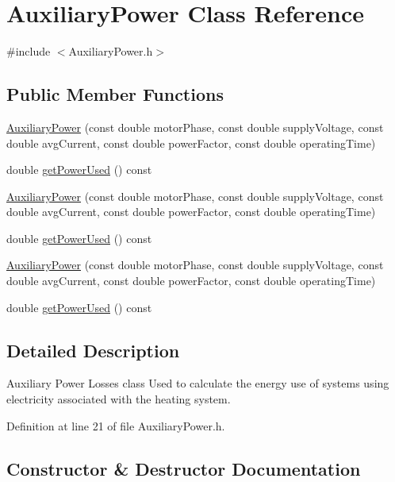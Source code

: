 \hypertarget{class_auxiliary_power}{}\section{Auxiliary\+Power Class Reference}
\label{class_auxiliary_power}


{\ttfamily \#include $<$Auxiliary\+Power.\+h$>$}

\subsection*{Public Member Functions}
\begin{DoxyCompactItemize}
\item 
\hyperlink{class_auxiliary_power_aef0d5c2c60a2481b16cc201ba2e69fe7}{Auxiliary\+Power} (const double motor\+Phase, const double supply\+Voltage, const double avg\+Current, const double power\+Factor, const double operating\+Time)
\item 
double \hyperlink{class_auxiliary_power_a824ece4e6bb789fceb1b55ecf2f678bd}{get\+Power\+Used} () const
\item 
\hyperlink{class_auxiliary_power_aef0d5c2c60a2481b16cc201ba2e69fe7}{Auxiliary\+Power} (const double motor\+Phase, const double supply\+Voltage, const double avg\+Current, const double power\+Factor, const double operating\+Time)
\item 
double \hyperlink{class_auxiliary_power_a824ece4e6bb789fceb1b55ecf2f678bd}{get\+Power\+Used} () const
\item 
\hyperlink{class_auxiliary_power_aef0d5c2c60a2481b16cc201ba2e69fe7}{Auxiliary\+Power} (const double motor\+Phase, const double supply\+Voltage, const double avg\+Current, const double power\+Factor, const double operating\+Time)
\item 
double \hyperlink{class_auxiliary_power_a824ece4e6bb789fceb1b55ecf2f678bd}{get\+Power\+Used} () const
\end{DoxyCompactItemize}


\subsection{Detailed Description}
Auxiliary Power Losses class Used to calculate the energy use of systems using electricity associated with the heating system. 

Definition at line 21 of file Auxiliary\+Power.\+h.



\subsection{Constructor \& Destructor Documentation}
\mbox{\label{class_auxiliary_power_aef0d5c2c60a2481b16cc201ba2e69fe7}} 
